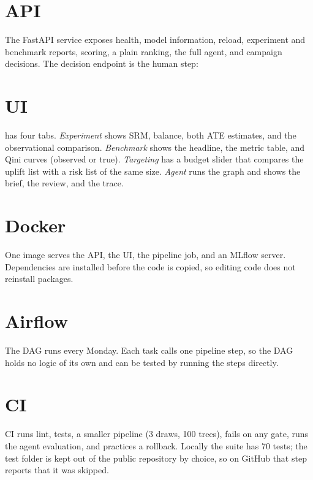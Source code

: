 \documentclass[11pt]{article}
\begin{document}
\section{API}
\label{sec:api}
The FastAPI service exposes health, model information, reload, experiment and benchmark reports, scoring, a plain ranking, the full agent, and campaign decisions. The decision endpoint is the human step:

\section{UI}
\label{sec:ui}
 has four tabs. \emph{Experiment} shows SRM, balance, both ATE estimates, and the observational comparison. \emph{Benchmark} shows the headline, the metric table, and Qini curves (observed or true). \emph{Targeting} has a budget slider that compares the uplift list with a risk list of the same size. \emph{Agent} runs the graph and shows the brief, the review, and the trace.

\section{Docker}
\label{sec:docker}
One image serves the API, the UI, the pipeline job, and an MLflow server. Dependencies are installed before the code is copied, so editing code does not reinstall packages.


\section{Airflow}
\label{sec:airflow}
The DAG runs every Monday. Each task calls one pipeline step, so the DAG holds no logic of its own and can be tested by running the steps directly.

\section{CI}
\label{sec:ci}

CI runs lint, tests, a smaller pipeline (3 draws, 100 trees), fails on any gate, runs the agent evaluation, and practices a rollback. Locally the suite has 70 tests; the test folder is kept out of the public repository by choice, so on GitHub that step reports that it was skipped.
\end{document}
